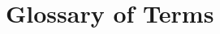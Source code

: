 \documentclass[a4paper,12pt,oneside]{ThesisStyle}
\begin{document}
\cleardoublepage



\cleardoublepage


\newcommand{\footcaption}[1]{\caption[#1]{#1\footnotemark.}}

\tableofcontents
\listoffigures 
\listoftables

\cleardoublepage

\chapter*{Glossary of Terms }
\end{document}
